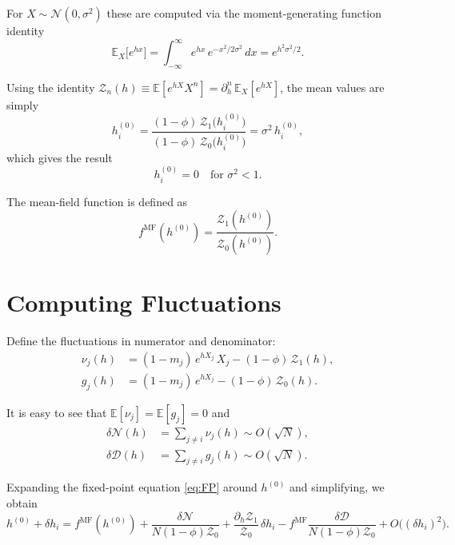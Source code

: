 \documentclass[aps,prb,onecolumn,showpacs,preprintnumbers,amsmath,amssymb]{revtex4-2}
\newcommand{\fMF}{f^{\mathrm{MF}}}
\newcommand{\hzero}{h^{(0)}}
\begin{document}
For $X \sim \mathcal{N}(0,\sigma^2)$ these are computed via the moment-generating
function identity
\begin{equation}
    \mathbb{E}_X\!\bigl[e^{hx}\bigr]
    = \int_{-\infty}^{\infty} e^{hx}\,e^{-x^2/2\sigma^2}\,dx
    = e^{h^2\sigma^2/2}.
\end{equation}

Using the identity $\mathcal{Z}_n(h) \equiv \mathbb{E}[e^{hX}X^n] = \partial_h^n\,\mathbb{E}_X[e^{hX}]$,
the mean values are simply
\begin{equation}
    \hzero_i = \frac{(1-\phi)\,\mathcal{Z}_1\!\bigl(\hzero_i\bigr)}
                    {(1-\phi)\,\mathcal{Z}_0\!\bigl(\hzero_i\bigr)}
             = \sigma^2\,\hzero_i,
\end{equation}
which gives the result
\begin{equation}
    \hzero_i = 0 \quad \text{for } \sigma^2 < 1.
\end{equation}

The mean-field function is defined as
\begin{equation}
    \fMF(h^{(0)}) = \frac{\mathcal{Z}_1(h^{(0)})}{\mathcal{Z}_0(h^{(0)})}.
\end{equation}

\section{Computing Fluctuations}

Define the fluctuations in numerator and denominator:
\begin{align}
    \nu_j(h) &= (1-m_j)\,e^{hX_j}\,X_j - (1-\phi)\,\mathcal{Z}_1(h), \\
    g_j(h)   &= (1-m_j)\,e^{hX_j}       - (1-\phi)\,\mathcal{Z}_0(h).
\end{align}

It is easy to see that $\mathbb{E}[\nu_j]=\mathbb{E}[g_j]=0$ and
\begin{align}
    \delta\mathcal{N}(h) &= \sum_{j\neq i}\nu_j(h) \sim O(\sqrt{N}), \\
    \delta\mathcal{D}(h) &= \sum_{j\neq i}g_j(h)   \sim O(\sqrt{N}).
\end{align}

Expanding the fixed-point equation \eqref{eq:FP} around $\hzero$ and simplifying,
we obtain
\begin{equation}
    \hzero + \delta h_i
    = \fMF(\hzero)
      + \frac{\delta\mathcal{N}}{N(1-\phi)\mathcal{Z}_0}
      + \frac{\partial_h\mathcal{Z}_1}{\mathcal{Z}_0}\,\delta h_i
      - \fMF\frac{\delta\mathcal{D}}{N(1-\phi)\mathcal{Z}_0}
      + O\!\bigl((\delta h_i)^2\bigr).
\end{equation}
\end{document}
